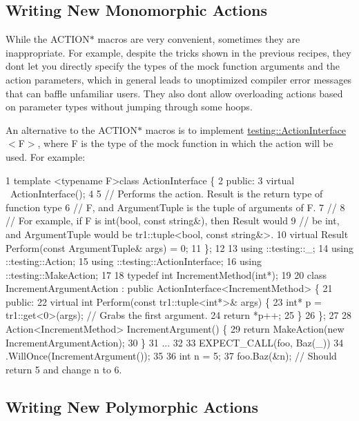 \subsection*{Writing New Monomorphic Actions}

While the {\ttfamily A\+C\+T\+I\+O\+N$\ast$} macros are very convenient, sometimes they are inappropriate. For example, despite the tricks shown in the previous recipes, they don\textquotesingle{}t let you directly specify the types of the mock function arguments and the action parameters, which in general leads to unoptimized compiler error messages that can baffle unfamiliar users. They also don\textquotesingle{}t allow overloading actions based on parameter types without jumping through some hoops.

An alternative to the {\ttfamily A\+C\+T\+I\+O\+N$\ast$} macros is to implement {\ttfamily \hyperlink{classtesting_1_1_action_interface}{testing\+::\+Action\+Interface}$<$F$>$}, where {\ttfamily F} is the type of the mock function in which the action will be used. For example\+:


\begin{DoxyCode}
1 template <typename F>class ActionInterface \{
2  public:
3   virtual ~ActionInterface();
4 
5   // Performs the action.  Result is the return type of function type
6   // F, and ArgumentTuple is the tuple of arguments of F.
7   //
8   // For example, if F is int(bool, const string&), then Result would
9   // be int, and ArgumentTuple would be tr1::tuple<bool, const string&>.
10   virtual Result Perform(const ArgumentTuple& args) = 0;
11 \};
12 
13 using ::testing::\_;
14 using ::testing::Action;
15 using ::testing::ActionInterface;
16 using ::testing::MakeAction;
17 
18 typedef int IncrementMethod(int*);
19 
20 class IncrementArgumentAction : public ActionInterface<IncrementMethod> \{
21  public:
22   virtual int Perform(const tr1::tuple<int*>& args) \{
23     int* p = tr1::get<0>(args);  // Grabs the first argument.
24     return *p++;
25   \}
26 \};
27 
28 Action<IncrementMethod> IncrementArgument() \{
29   return MakeAction(new IncrementArgumentAction);
30 \}
31 ...
32 
33   EXPECT\_CALL(foo, Baz(\_))
34       .WillOnce(IncrementArgument());
35 
36   int n = 5;
37   foo.Baz(&n);  // Should return 5 and change n to 6.
\end{DoxyCode}


\subsection*{Writing New Polymorphic Actions}

